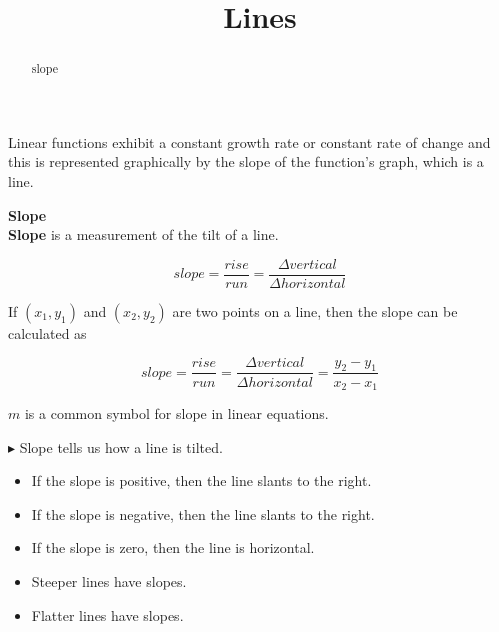 \documentclass{ximera}
\title{Lines}
\begin{document}
\begin{abstract}
slope
\end{abstract}
\maketitle



Linear functions exhibit a constant growth rate or constant rate of change and this is represented graphically by the slope of the function's graph, which is a line.


\begin{definition} \textbf{\textcolor{green!50!black}{Slope}} \\


\textbf{Slope} is a measurement of the tilt of a line.


\[
slope = \frac{rise}{run} = \frac{\Delta vertical}{\Delta horizontal}
\]


If $(x_1, y_1)$ and $(x_2, y_2)$ are two points on a line, then the slope can be calculated as

\[
slope = \frac{rise}{run} = \frac{\Delta vertical}{\Delta horizontal} = \frac{y_2 - y_1}{x_2 - x_1}
\]



\end{definition}


$m$ is a common symbol for slope in linear equations.




\begin{observation}

$\blacktriangleright$ Slope tells us how a line is tilted.


\begin{itemize}
\item If the slope is positive, then the line slants   to the right.
\item If the slope is negative, then the line slants   to the right.
\item If the slope is zero, then the line is horizontal.
\end{itemize}


\begin{itemize}
\item Steeper lines have  slopes.
\item Flatter lines have  slopes.
\end{itemize}

\end{observation}
\end{document}
